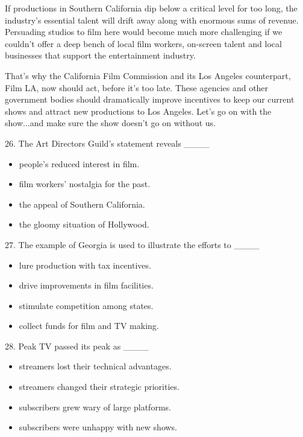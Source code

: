 \documentclass[UTF8,11pt]{ctexart}
\begin{document}
If productions in Southern California dip below a critical level for too long, the industry’s essential talent will drift away along with enormous sums of revenue. Persuading studios to film here would become much more challenging if we couldn’t offer a deep bench of local film workers, on-screen talent and local businesses that support the entertainment industry.


That’s why the California Film Commission and its Los Angeles counterpart, Film LA, now should act, before it’s too late. These agencies and other government bodies should dramatically improve incentives to keep our current shows and attract new productions to Los Angeles. Let’s go on with the show...and make sure the show doesn’t go on without us.


26. The Art Directors Guild’s statement reveals \_\_\_\_


\begin{itemize}[leftmargin=2em,itemsep=.2em,topsep=.4em]\item[A.] people’s reduced interest in film.
\item[B.] film workers’ nostalgia for the past.
\item[C.] the appeal of Southern California.
\item[D.] the gloomy situation of Hollywood.
\end{itemize}

27. The example of Georgia is used to illustrate the efforts to \_\_\_\_


\begin{itemize}[leftmargin=2em,itemsep=.2em,topsep=.4em]\item[A.] lure production with tax incentives.
\item[B.] drive improvements in film facilities.
\item[C.] stimulate competition among states.
\item[D.] collect funds for film and TV making.
\end{itemize}

28. Peak TV passed its peak as \_\_\_\_


\begin{itemize}[leftmargin=2em,itemsep=.2em,topsep=.4em]\item[A.] streamers lost their technical advantages.
\item[B.] streamers changed their strategic priorities.
\item[C.] subscribers grew wary of large platforms.
\item[D.] subscribers were unhappy with new shows.
\end{itemize}
\end{document}
